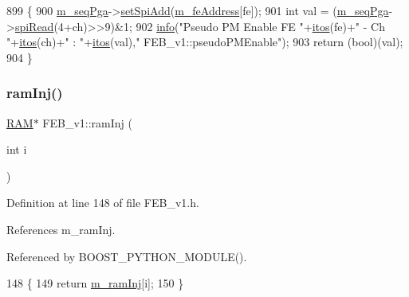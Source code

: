 \begin{DoxyCode}
899                                             \{
900   \hyperlink{classFEB__v1_a6c7804ac86796f233a8393043adf2e77}{m\_seqPga}->\hyperlink{classSeqPGA_ac998ce3a6d9b5f2e88cc8393f8c1df53}{setSpiAdd}(\hyperlink{classFEB__v1_a4e1945c2d5b434125f375e9d0fc6d99f}{m\_feAddress}[fe]);
901   \textcolor{keywordtype}{int} val = (\hyperlink{classFEB__v1_a6c7804ac86796f233a8393043adf2e77}{m\_seqPga}->\hyperlink{classSeqPGA_ab3d0e5e5d4014bc7a92588a76b8713d4}{spiRead}(4+ch)>>9)&1;
902   \hyperlink{classObject_a644fd329ea4cb85f54fa6846484b84a8}{info}(\textcolor{stringliteral}{"Pseudo PM Enable FE "}+\hyperlink{Tools_8h_af330027dbdafb9a30768b3613c553e60}{itos}(fe)+\textcolor{stringliteral}{" - Ch "}+\hyperlink{Tools_8h_af330027dbdafb9a30768b3613c553e60}{itos}(ch)+\textcolor{stringliteral}{" : "}+\hyperlink{Tools_8h_af330027dbdafb9a30768b3613c553e60}{itos}(val),\textcolor{stringliteral}{"
      FEB\_v1::pseudoPMEnable"});
903   \textcolor{keywordflow}{return} (\textcolor{keywordtype}{bool})(val);
904 \}
\end{DoxyCode}
\mbox{\label{classFEB__v1_aceff066f476794fefe2712e43bc2d6d2}} 
\subsubsection{\texorpdfstring{ram\+Inj()}{ramInj()}}
{\footnotesize\ttfamily \hyperlink{classRAM}{R\+AM}$\ast$ F\+E\+B\+\_\+v1\+::ram\+Inj (\begin{DoxyParamCaption}\item[{int}]{i }\end{DoxyParamCaption})\hspace{0.3cm}{\ttfamily [inline]}}



Definition at line 148 of file F\+E\+B\+\_\+v1.\+h.



References m\+\_\+ram\+Inj.



Referenced by B\+O\+O\+S\+T\+\_\+\+P\+Y\+T\+H\+O\+N\+\_\+\+M\+O\+D\+U\+L\+E().


\begin{DoxyCode}
148                      \{
149     \textcolor{keywordflow}{return} \hyperlink{classFEB__v1_a3a3d06225c94c88d4cc5da7a6bde3867}{m\_ramInj}[i];
150   \}
\end{DoxyCode}
\mbox{\label{classFEB__v1_ac59216f094007ede67d49bd23287be73}} 
